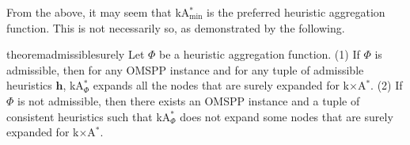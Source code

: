 \documentclass[smallextended]{svjour3}       %
\newcommand{\omspp}{\ac{OMSPP}\xspace}
\newcommand{\kastarvar}[1]{\textup{kA}$^*_{#1}$\xspace}
\newcommand{\kastarmin}{\kastarvar{\min}}
\newcommand{\kastarmax}{\kastarvar{\max}}
\newcommand{\kastarphi}{\textup{kA}$^*_{\Phi}$\xspace}
\newcommand{\kxastar}{k$\times$A$^*$\xspace}
\newcommand{\axiomadm}{admissible\xspace}
\newcommand{\vect}[1]{\mathbf{#1}}
\begin{document}
From the above, it may seem that \kastarmin is the preferred heuristic aggregation function. This is not necessarily so, as demonstrated by the following. 


\begin{restatable}{theorem}{admissiblesurely}
  \label{the:admissible-surely}
  Let $\Phi$ be a heuristic aggregation function.
  (1) If $\Phi$ is \axiomadm, then for any \omspp instance and for any tuple of admissible heuristics $\vect{h}$, \kastarphi expands all the nodes that are surely expanded for \kxastar.
  (2) If $\Phi$ is not \axiomadm, then there exists an \omspp instance and a tuple of consistent heuristics such that \kastarphi does not expand some nodes that are surely expanded for \kxastar.
\end{restatable}

\end{document}
